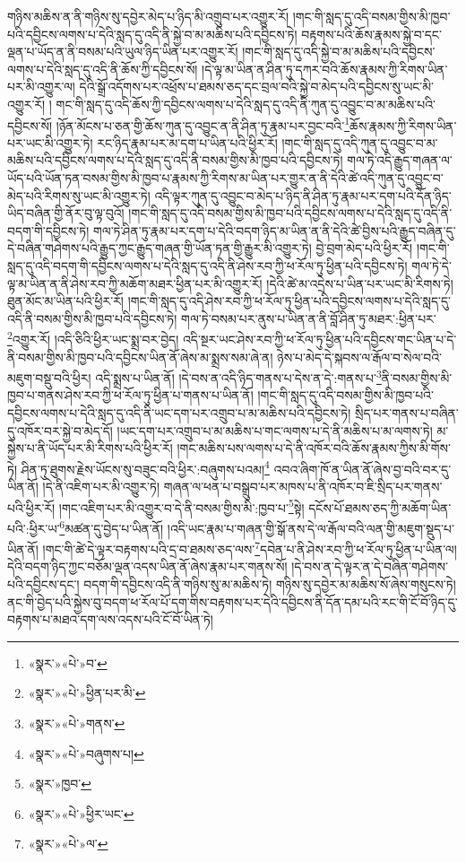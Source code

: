 གཉིས་མཆིས་ན་ནི་གཉིས་སུ་དབྱེར་མེད་པ་ཉིད་མི་འགྲུབ་པར་འགྱུར་རོ། །གང་གི་སླད་དུ་འདི་བསམ་གྱིས་མི་ཁྱབ་པའི་དབྱིངས་ལགས་པ་དེའི་སླད་དུ་འདི་ནི་སྐྱེ་བ་མ་མཆིས་པའི་དབྱིངས་ཏེ། བརྟགས་པའི་ཆོས་རྣམས་སྐྱེ་བ་དང་ལྡན་པ་ཡོད་ན་ནི་བསམ་པའི་ཡུལ་ཉིད་ཡིན་པར་འགྱུར་རོ། །གང་གི་སླད་དུ་འདི་སྐྱེ་བ་མ་མཆིས་པའི་དབྱིངས་ལགས་པ་དེའི་སླད་དུ་འདི་ནི་ཆོས་ཀྱི་དབྱིངས་སོ། །དེ་ལྟ་མ་ཡིན་ན་ཤིན་ཏུ་དཀར་བའི་ཆོས་རྣམས་ཀྱི་རིགས་ཡིན་པར་མི་འགྱུར་ལ། དེའི་སྒྲོ་འདོགས་པར་འཕྲོས་པ་ཐམས་ཅད་དང་བྲལ་བའི་སྐྱེ་བ་མེད་པའི་དབྱིངས་སུ་ཡང་མི་འགྱུར་རོ། །
གང་གི་སླད་དུ་འདི་ཆོས་ཀྱི་དབྱིངས་ལགས་པ་དེའི་སླད་དུ་འདི་ནི་ཀུན་དུ་འབྱུང་བ་མ་མཆིས་པའི་དབྱིངས་སོ། །ཉོན་མོངས་པ་ཅན་གྱི་ཆོས་ཀུན་དུ་འབྱུང་ན་ནི་ཤིན་ཏུ་རྣམ་པར་བྱང་བའི་\footnote{«སྣར་»«པེ་»བ་}ཆོས་རྣམས་ཀྱི་རིགས་ཡིན་པར་ཡང་མི་འགྱུར་ཏེ། རང་ཉིད་རྣམ་པར་མ་དག་པ་ཡིན་པའི་ཕྱིར་རོ། །གང་གི་སླད་དུ་འདི་ཀུན་དུ་འབྱུང་བ་མ་མཆིས་པའི་དབྱིངས་ལགས་པ་དེའི་སླད་དུ་འདི་ནི་བསམ་གྱིས་མི་ཁྱབ་པའི་དབྱིངས་ཏེ། གལ་ཏེ་འདི་རྒྱུད་གཞན་ལ་ཡོད་པའི་ཡོན་ཏན་བསམ་གྱིས་མི་ཁྱབ་པ་རྣམས་ཀྱི་རིགས་མ་ཡིན་པར་གྱུར་ན་ནི་དེའི་ཚེ་འདི་ཀུན་དུ་འབྱུང་བ་མེད་པའི་རིགས་སུ་ཡང་མི་འགྱུར་ཏེ། འདི་ལྟར་ཀུན་དུ་འབྱུང་བ་མེད་པ་ཉིད་ནི་ཤིན་ཏུ་རྣམ་པར་དག་པའི་དོན་ཉིད་ཡིད་བཞིན་གྱི་ནོར་བུ་ལྟ་བུའོ། །གང་གི་སླད་དུ་འདི་བསམ་གྱིས་མི་ཁྱབ་པའི་དབྱིངས་ལགས་པ་དེའི་སླད་དུ་འདི་ནི་བདག་གི་དབྱིངས་ཏེ། གལ་ཏེ་ཤིན་ཏུ་རྣམ་པར་དག་པ་དེའི་བདག་ཉིད་མ་ཡིན་ན་ནི་དེའི་ཚེ་བྱིས་པའི་རྒྱུད་བཞིན་དུ་དེ་བཞིན་གཤེགས་པའི་རྒྱུད་ཀྱང་རྒྱུད་གཞན་གྱི་ཡོན་ཏན་གྱི་རྒྱུར་མི་འགྱུར་ཏེ། བྱེ་བྲག་མེད་པའི་ཕྱིར་རོ། །གང་གི་སླད་དུ་འདི་བདག་གི་དབྱིངས་ལགས་པ་དེའི་སླད་དུ་འདི་ནི་ཤེས་རབ་ཀྱི་ཕ་རོལ་ཏུ་ཕྱིན་པའི་དབྱིངས་ཏེ། གལ་ཏེ་དེ་ལྟ་མ་ཡིན་ན་ནི་ཤེས་རབ་ཀྱི་མཆོག་མཐར་ཕྱིན་པར་མི་འགྱུར་རོ། །དེའི་ཚེ་མ་འདྲེས་པ་ཡིན་པར་ཡང་མི་རིགས་ཏེ། ཐུན་མོང་མ་ཡིན་པའི་ཕྱིར་རོ། །གང་གི་སླད་དུ་འདི་ཤེས་རབ་ཀྱི་ཕ་རོལ་ཏུ་ཕྱིན་པའི་དབྱིངས་ལགས་པ་དེའི་སླད་དུ་འདི་ནི་བསམ་གྱིས་མི་ཁྱབ་པའི་དབྱིངས་ཏེ། གལ་ཏེ་བསམ་པར་ནུས་པ་ཡིན་ན་ནི་བློ་ཤིན་ཏུ་མཐར་:ཕྱིན་པར་\footnote{«སྣར་»«པེ་»ཕྱིན་པར་མི་}འགྱུར་རོ། །འདི་ཅིའི་ཕྱིར་ཡང་སྨྲ་བར་བྱེད། འདི་སྔར་ཡང་ཤེས་རབ་ཀྱི་ཕ་རོལ་ཏུ་ཕྱིན་པའི་དབྱིངས་གང་ཡིན་པ་དེ་ནི་བསམ་གྱིས་མི་ཁྱབ་པའི་དབྱིངས་ཡིན་ནོ་ཞེས་མ་སྨྲས་སམ་ཞེ་ན། ཉེས་པ་མེད་དེ་སྐབས་ལ་རྒོལ་བ་སེལ་བའི་མཇུག་བསྡུ་བའི་ཕྱིར། འདི་སྨྲས་པ་ཡིན་ནོ། །དེ་བས་ན་འདི་ཉིད་གནས་པ་དེས་ན་དེ་:གནས་པ་\footnote{«སྣར་»«པེ་»གནས་}ནི་བསམ་གྱིས་མི་ཁྱབ་པ་གནས་ཤེས་རབ་ཀྱི་ཕ་རོལ་ཏུ་ཕྱིན་པ་གནས་པ་ཡིན་ནོ། །གང་གི་སླད་དུ་འདི་བསམ་གྱིས་མི་ཁྱབ་པའི་དབྱིངས་ལགས་པ་དེའི་སླད་དུ་འདི་ནི་ཡང་དག་པར་འགྲུབ་པ་མ་མཆིས་པའི་དབྱིངས་ཏེ། སྲིད་པར་གནས་པ་བཞིན་དུ་འཁོར་བར་སྐྱེ་བ་མེད་དོ། །ཡང་དག་པར་འགྲུབ་པ་མ་མཆིས་པ་གང་ལགས་པ་དེ་ནི་མཆིས་པ་མ་ལགས་ཏེ། མ་སྐྱེས་པ་ནི་ཡོད་པར་མི་རིགས་པའི་ཕྱིར་རོ། །གང་མཆིས་པས་ལགས་པ་དེ་ནི་འཁོར་བའི་ཆོས་རྣམས་ཀྱིས་མི་གོས་ཏེ། ཤིན་ཏུ་ཐུགས་རྗེས་ཡོངས་སུ་བཟུང་བའི་ཕྱིར་:བཞུགས་པའམ།\footnote{«སྣར་»«པེ་»བཞུགས་པ།} འབའ་ཞིག་ཁོ་ན་ཡིན་ནོ་ཞེས་བྱ་བའི་བར་དུ་ཡིན་ནོ། །དེ་ནི་འཇིག་པར་མི་འགྱུར་ཏེ། གཞན་ལ་ཕན་པ་བསྒྲུབ་པར་མཁས་པ་ནི་འཁོར་བ་ཇི་སྲིད་པར་གནས་པའི་ཕྱིར་རོ། །གང་འཇིག་པར་མི་འགྱུར་བ་དེ་ནི་བསམ་གྱིས་མི་:ཁྱབ་པ་\footnote{«སྣར་»ཁྱབ་}སྟེ། དངོས་པོ་ཐམས་ཅད་ཀྱི་མཆོག་ཡིན་པའི་:ཕྱིར་ཡ་\footnote{«སྣར་»«པེ་»ཕྱིར་ཡང་}མཚན་དུ་བྱེད་པ་ཡིན་ནོ། །འདི་ཡང་རྣམ་པ་གཞན་གྱི་སྒོ་ནས་དེ་ལ་རྒོལ་བའི་ལན་གྱི་མཇུག་སྡུད་པ་ཡིན་ནོ། །གང་གི་ཚེ་དེ་ལྟར་བརྟགས་པའི་དྲ་བ་ཐམས་ཅད་ལས་\footnote{«སྣར་»«པེ་»ལ་}དབེན་པ་ནི་ཤེས་རབ་ཀྱི་ཕ་རོལ་ཏུ་ཕྱིན་པ་ཡིན་ལ། དེའི་བདག་ཉིད་ཀྱང་བཅོམ་ལྡན་འདས་ཡིན་ནོ་ཞེས་རྣམ་པར་གནས་སོ། །དེ་བས་ན་དེ་ལྟར་ན་དེ་བཞིན་གཤེགས་པའི་དབྱིངས་དང་། བདག་གི་དབྱིངས་འདི་ནི་གཉིས་སུ་མ་མཆིས་ཏེ། གཉིས་སུ་དབྱེར་མ་མཆིས་སོ་ཞེས་གསུངས་ཏེ། ནང་གི་བྱེད་པའི་སྐྱེས་བུ་བདག་ཕ་རོལ་པོ་དག་གིས་བརྟགས་པར་དེའི་དབྱིངས་ནི་དོན་དམ་པའི་རང་གི་ངོ་བོ་ཉིད་དུ་བརྟགས་པ་མཐའ་དག་ལས་འདས་པའི་ངོ་བོ་ཡིན་ཏེ། 